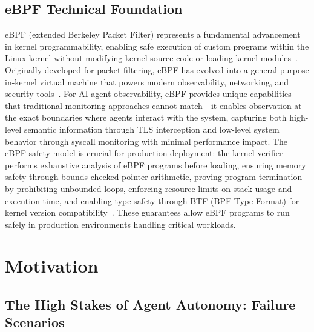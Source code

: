 \subsection{eBPF Technical Foundation}

eBPF (extended Berkeley Packet Filter) represents a fundamental advancement in kernel programmability, enabling safe execution of custom programs within the Linux kernel without modifying kernel source code or loading kernel modules~\cite{brendangregg}. Originally developed for packet filtering, eBPF has evolved into a general-purpose in-kernel virtual machine that powers modern observability, networking, and security tools~\cite{ebpfio,cilium}. For AI agent observability, eBPF provides unique capabilities that traditional monitoring approaches cannot match—it enables observation at the exact boundaries where agents interact with the system, capturing both high-level semantic information through TLS interception and low-level system behavior through syscall monitoring with minimal performance impact. The eBPF safety model is crucial for production deployment: the kernel verifier performs exhaustive analysis of eBPF programs before loading, ensuring memory safety through bounds-checked pointer arithmetic, proving program termination by prohibiting unbounded loops, enforcing resource limits on stack usage and execution time, and enabling type safety through BTF (BPF Type Format) for kernel version compatibility~\cite{kerneldoc}. These guarantees allow eBPF programs to run safely in production environments handling critical workloads.

\section{Motivation}

\subsection{The High Stakes of Agent Autonomy: Failure Scenarios}

